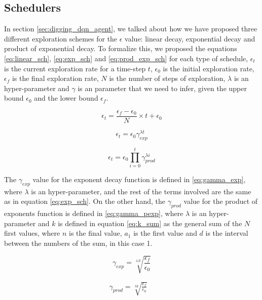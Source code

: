 \subsection{Schedulers}
\label{sec:schedulers}
In section \ref{sec:digging_dqn_agent}, we talked about how we have proposed three different exploration schemes for the $\epsilon$ value: linear decay, exponential decay and product of exponential decay. To formalize this, we proposed the equations \ref{eq:linear_sch}, \ref{eq:exp_sch} and \ref{eq:prod_exp_sch} for each type of schedule, $\epsilon_t$ is the current exploration rate for a time-step $t$,  $\epsilon_0$ is the initial exploration rate, $\epsilon_f$ is the final exploration rate, $N$ is the number of steps of exploration, $\lambda$ is an hyper-parameter and $\gamma$ is an parameter that we need to infer, given the upper bound $\epsilon_0$ and the lower bound $\epsilon_f$. 

\begin{equation}
	\label{eq:linear_sch}
	\epsilon_t = \frac{\epsilon_f - \epsilon_0}{N} \times t + \epsilon_0
\end{equation}

\begin{equation}
	\label{eq:exp_sch}
	\epsilon_t = \epsilon_0 \gamma_{exp}^{\lambda t}
\end{equation}

\begin{equation}
	\label{eq:prod_exp_sch}
	\epsilon_t = \epsilon_0 \prod_{i=0}^{t} \gamma_{prod}^{\lambda i}
\end{equation}

The $\gamma_{exp}$ value for the exponent decay function is defined in \ref{eq:gamma_exp}, where $\lambda$ is an hyper-parameter, and the rest of the terms involved are the same as in equation \ref{eq:exp_sch}. On the other hand, the $\gamma_{prod}$ value for the product of exponents function is defined in  \ref{eq:gamma_pexp}, where $\lambda$ is an hyper-parameter and $k$ is defined in equation \ref{eq:k_sum} as the general sum of the $N$ first values, where $n$ is the final value, $a_1$ is the first value and $d$ is the interval between the numbers of the sum, in this case 1.

\begin{equation}
	\label{eq:gamma_exp}
	\gamma_{exp} = \sqrt[\lambda N]{\frac{\epsilon_f}{\epsilon_0}}
\end{equation}

\begin{align}
	\gamma_{prod} = \sqrt[\lambda k]{\frac{\epsilon_f}{\epsilon_0}} \quad \label{eq:gamma_pexp}
\end{align}

